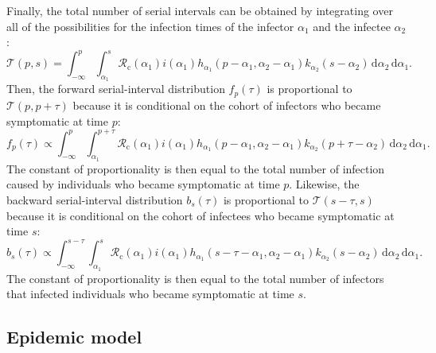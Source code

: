 \documentclass[12pt]{article}
\newcommand{\Rx}[1]{\ensuremath{{\mathcal R}_{#1}}\xspace}
\newcommand{\Rc}{\Rx{\mathrm{c}}}
\newcommand{\pt}{p} %
\newcommand{\st}{s} %
\newcommand{\total}{{\mathcal T}} %
\begin{document}
Finally, the total number of serial intervals can be obtained by integrating over all of the possibilities for the infection times of the infector $\alpha_1$ and the infectee $\alpha_2$:
\begin{equation}
\total (\pt,\st) = \int_{-\infty}^{\pt} \int_{\alpha_1}^{\st} \Rc (\alpha_1) i(\alpha_1) h_{\alpha_1}(\pt-\alpha_1, \alpha_2 - \alpha_1) k_{\alpha_2}(\st - \alpha_2) \, \mathrm{d}\alpha_2\,\mathrm{d}\alpha_1.
\end{equation}
Then, the forward serial-interval distribution $f_\pt(\tau)$ is proportional to $\total (\pt, \pt+\tau)$ because it is conditional on the cohort of infectors who became symptomatic at time $\pt$:
\begin{equation}
f_\pt(\tau) \propto \int_{-\infty}^{\pt} \int_{\alpha_1}^{\pt+\tau} \Rc (\alpha_1) i(\alpha_1) h_{\alpha_1}(\pt-\alpha_1, \alpha_2 - \alpha_1) k_{\alpha_2}(\pt+\tau - \alpha_2) \, \mathrm{d}\alpha_2\,\mathrm{d}\alpha_1.
\end{equation}
The constant of proportionality is then equal to the total number of infection caused by individuals who became symptomatic at time $\pt$.
Likewise, the backward serial-interval distribution $b_\st(\tau)$ is proportional to $\total (\st-\tau, \st)$ because it is conditional on the cohort of infectees who became symptomatic at time $\st$:
\begin{equation}
b_\st(\tau) \propto \int_{-\infty}^{\st-\tau} \int_{\alpha_1}^{\st} \Rc (\alpha_1) i(\alpha_1) h_{\alpha_1}(\st-\tau-\alpha_1, \alpha_2 - \alpha_1) k_{\alpha_2}(\st - \alpha_2) \, \mathrm{d}\alpha_2\,\mathrm{d}\alpha_1.
\end{equation}
The constant of proportionality is then equal to the total number of infectors that infected individuals who became symptomatic at time $\st$.

\subsection{Epidemic model}
\end{document}
